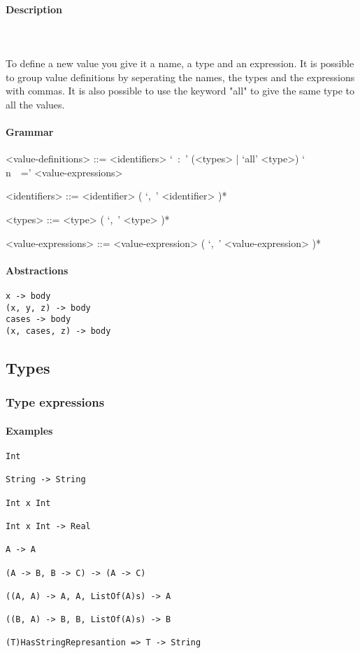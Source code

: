 \documentclass{article}
\def\pend{\mbox{} \\\\}
\begin{document}
\paragraph{Description}\pend
To define a new value you give it a name, a type and an expression. It is possible
to group value definitions by seperating the names, the types and the expressions
with commas. It is also possible to use the keyword "all" to give the same type
to all the values.

\paragraph{Grammar}
\begin{grammar}
<value-definitions> ::=
<identifiers> `\ :\ ' (<types> | `all' <type>) `\\n\ \ =' <value-expressions>

<identifiers> ::= <identifier> ( `,\ ' <identifier> )*  

<types> ::= <type> ( `,\ ' <type> )*  

<value-expressions> ::= <value-expression> ( `,\ ' <value-expression> )*  
\end{grammar}


\paragraph{Abstractions}

\begin{verbatim}
x -> body
(x, y, z) -> body
cases -> body
(x, cases, z) -> body
\end{verbatim}

\subsection{Types}

\subsubsection{Type expressions}

\paragraph{Examples}

\begin{verbatim}
Int

String -> String 

Int x Int 

Int x Int -> Real

A -> A

(A -> B, B -> C) -> (A -> C)

((A, A) -> A, A, ListOf(A)s) -> A

((B, A) -> B, B, ListOf(A)s) -> B

(T)HasStringRepresantion => T -> String
\end{verbatim}
\end{document}
